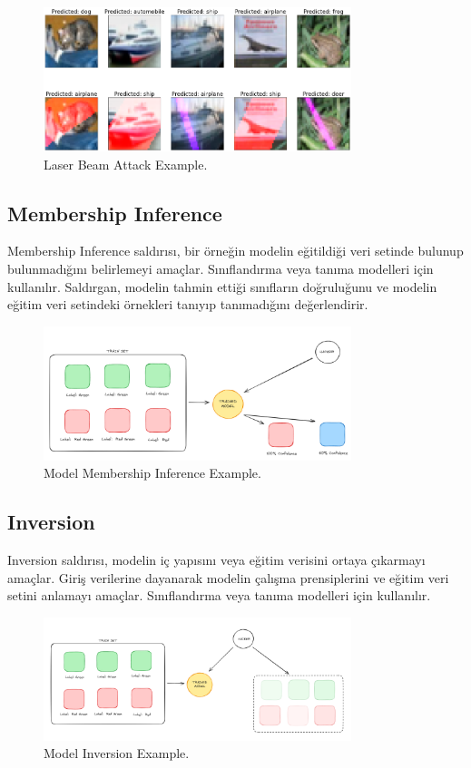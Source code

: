 \begin{figure}[h]
  \centering
  \includegraphics[width=0.8\textwidth]{images/evasion_laser_beam.png}
  \caption{Laser Beam Attack Example.}
\end{figure}

\subsection{Membership Inference}
Membership Inference saldırısı, bir örneğin modelin eğitildiği veri setinde bulunup bulunmadığını belirlemeyi amaçlar. Sınıflandırma veya tanıma modelleri için kullanılır. Saldırgan, modelin tahmin ettiği sınıfların doğruluğunu ve modelin eğitim veri setindeki örnekleri tanıyıp tanımadığını değerlendirir.

\begin{figure}[h]
  \centering
  \includegraphics[width=0.8\textwidth]{images/ai_sec_membership_inference.png}
  \caption{Model Membership Inference Example.}
\end{figure}

\subsection{Inversion}
Inversion saldırısı, modelin iç yapısını veya eğitim verisini ortaya çıkarmayı amaçlar. Giriş verilerine dayanarak modelin çalışma prensiplerini ve eğitim veri setini anlamayı amaçlar. Sınıflandırma veya tanıma modelleri için kullanılır.

\begin{figure}[h]
  \centering
  \includegraphics[width=0.8\textwidth]{images/ai_sec_model_inversion.png}
  \caption{Model Inversion Example.}
\end{figure}

